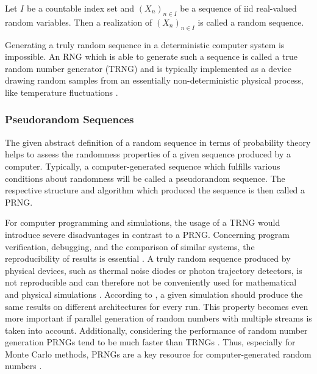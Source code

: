 \documentclass{stdlocal}
\begin{document}
    \begin{definition}
      Let $I$ be a countable index set and $(X_n)_{n\in I}$ be a sequence of iid real-valued random variables.
      Then a realization of $(X_n)_{n\in I}$ is called a random sequence.
    \end{definition}
    Generating a truly random sequence in a deterministic computer system is impossible.
    An RNG which is able to generate such a sequence is called a true random number generator (TRNG) and is typically implemented as a device drawing random samples from an essentially non-deterministic physical process, like temperature fluctuations \autocite{intel-drng}.

    \subsubsection{Pseudorandom Sequences}
    The given abstract definition of a random sequence in terms of probability theory helps to assess the randomness properties of a given sequence produced by a computer.
    Typically, a computer-generated sequence which fulfills various conditions about randomness will be called a pseudorandom sequence.
    The respective structure and algorithm which produced the sequence is then called a PRNG.

    For computer programming and simulations, the usage of a TRNG would introduce severe disadvantages in contrast to a PRNG.
    Concerning program verification, debugging, and the comparison of similar systems, the reproducibility of results is essential \autocite{lecuyer2015}.
    A truly random sequence produced by physical devices, such as thermal noise diodes or photon trajectory detectors, is not reproducible and can therefore not be conveniently used for mathematical and physical simulations \autocite{lecuyer2015}.
    According to \textcite{lecuyer2015}, a given simulation should produce the same results on different architectures for every run.
    This property becomes even more important if parallel generation of random numbers with multiple streams is taken into account.
    Additionally, considering the performance of random number generation PRNGs tend to be much faster than TRNGs \autocite{intel-drng}.
    Thus, especially for Monte Carlo methods, PRNGs are a key resource for computer-generated random numbers \autocite{bauke2007}.
\end{document}
